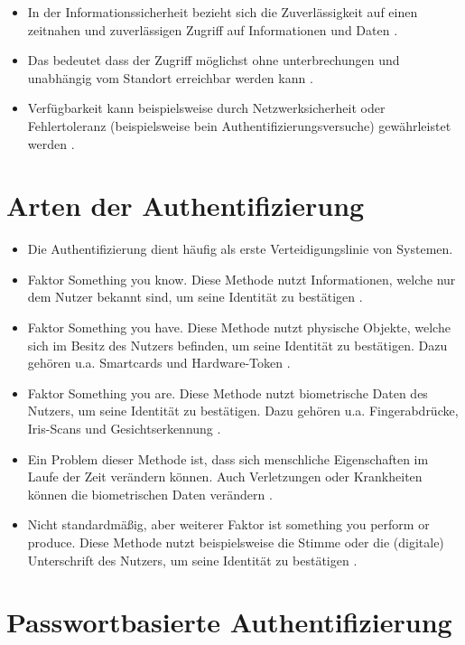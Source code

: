 \begin{itemize}
    \item In der Informationssicherheit bezieht sich die Zuverlässigkeit auf einen zeitnahen und zuverlässigen Zugriff auf Informationen und Daten \cite{samonas2014cia}.
    \item Das bedeutet dass der Zugriff möglichst ohne unterbrechungen und unabhängig vom Standort erreichbar werden kann \cite{agarwal2011security}. 
    \item Verfügbarkeit kann beispielsweise durch Netzwerksicherheit oder Fehlertoleranz (beispielsweise bein Authentifizierungsversuche) gewährleistet werden \cite{agarwal2011security}.
\end{itemize}

\section{Arten der Authentifizierung}
\begin{itemize}
    \item Die Authentifizierung dient häufig als erste Verteidigungslinie von Systemen. \cite{boonkrong2012security}
    \item Faktor Something you know. Diese Methode nutzt Informationen, welche nur dem Nutzer bekannt sind, um seine Identität zu bestätigen \cite{boonkrong2012security}.
    \item Faktor Something you have. Diese Methode nutzt physische Objekte, welche sich im Besitz des Nutzers befinden, um seine Identität zu bestätigen. Dazu gehören u.a. Smartcards und Hardware-Token \cite{boonkrong2012security}.
    \item Faktor Something you are. Diese Methode nutzt biometrische Daten des Nutzers, um seine Identität zu bestätigen. Dazu gehören u.a. Fingerabdrücke, Iris-Scans und Gesichtserkennung \cite{boonkrong2012security}.
    \item Ein Problem dieser Methode ist, dass sich menschliche Eigenschaften im Laufe der Zeit verändern können. Auch Verletzungen oder Krankheiten können die biometrischen Daten verändern \cite{boonkrong2012security}.
    \item Nicht standardmäßig, aber weiterer Faktor ist something you perform or produce. Diese Methode nutzt beispielsweise die Stimme oder die (digitale) Unterschrift des Nutzers, um seine Identität zu bestätigen \cite{boonkrong2012security}.
\end{itemize}


\section{Passwortbasierte Authentifizierung}\label{pw-auth}

